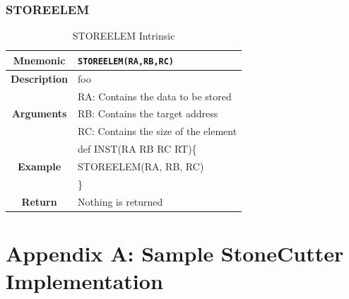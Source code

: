 \documentclass{article}
\begin{document}
\clearpage
\subsubsection{STOREELEM}
\label{sec:STOREELEM}

\begin{table}[h]
\begin{center}
\caption{STOREELEM Intrinsic}
\vspace{0.125in}
\label{tab:STOREELEMIntrinsic}
\begin{tabular}{|c|l|}
\hline
\textbf{Mnemonic} & \texttt{STOREELEM(RA,RB,RC)}\\
\hline
\textbf{Description} & foo\\
\hline
\multirow{3}{*}{\textbf{Arguments}} & RA: Contains the data to be stored\\
                          			     & RB: Contains the target address \\
			     			     & RC: Contains the size of the element \\
\hline
\multirow{3}{*}{\textbf{Example}} & def INST(RA RB RC RT)\{\\
                          			  &   STOREELEM(RA, RB, RC)\\
                                                    & \}\\
\hline
\textbf{Return} & Nothing is returned\\                                                    
\hline
\end{tabular}
\end{center}
\end{table}

\clearpage
\section{Appendix A: Sample StoneCutter Implementation}
\label{sec:AppendixA}

\vspace{0.125in}


\clearpage
\end{document}
